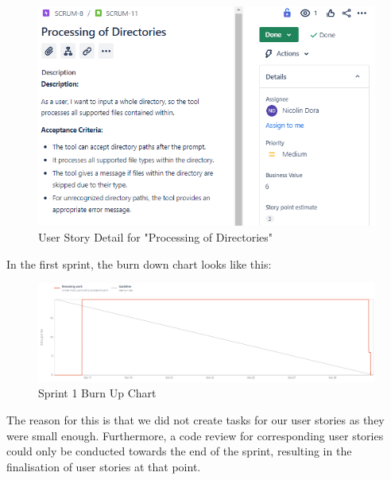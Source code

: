 \begin{figure}[h!]
    \centering
    \includegraphics[width=1\textwidth]{pictures/Scrum/Sprint 1/UserStory_3}
    \caption{User Story Detail for "Processing of Directories"}
    \label{fig:sprint_1_userstory_4}
\end{figure}
\clearpage

In the first sprint, the burn down chart looks like this:
\begin{figure}[h!]
    \centering
    \includegraphics[width=1\textwidth]{pictures/Scrum/Sprint 1/sprint1_burndownchart}
    \caption{Sprint 1 Burn Up Chart}
    \label{fig:sprint_1_bunrdown_chart}
\end{figure}

The reason for this is that we did not create tasks for our user stories as they were small enough.
Furthermore, a code review for corresponding user stories could only be conducted towards the end of the sprint, resulting in the finalisation of user stories at that point.
\clearpage

